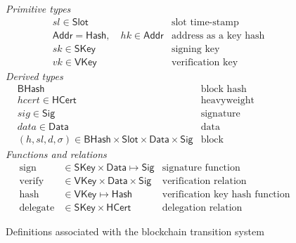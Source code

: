 \documentclass[11pt,a4paper]{article}
\newcommand{\powerset}[1]{\mathbb{P}~#1}
\newcommand{\var}[1]{\mathit{#1}}
\newcommand{\fun}[1]{\mathsf{#1}}
\newcommand{\type}[1]{\mathsf{#1}}
\newcommand{\TxId}{\type{TxId}}
\newcommand{\Ix}{\type{Ix}}
\newcommand{\Hash}{\type{Hash}}    %
\newcommand{\BHash}{\type{BHash}}  %
\newcommand{\Addr}{\type{Addr}}
\newcommand{\Slot}{\type{Slot}}
\newcommand{\HCert}{\type{HCert}}
\newcommand{\Tx}{\type{Tx}}
\newcommand{\TxIn}{\type{TxIn}}
\newcommand{\TxOut}{\type{TxOut}}
\newcommand{\SKey}{\type{SKey}}
\newcommand{\VKey}{\type{VKey}}
\newcommand{\Sig}{\type{Sig}}
\newcommand{\Data}{\type{Data}}
\newcommand{\hashname}{hash}
\newcommand{\signname}{sign}
\newcommand{\verifyname}{verify}
\newcommand{\delegatename}{delegate}
\newcommand{\inputs}[1]{\fun{inputs}\ \var{#1}}
\newcommand{\witnesses}[1]{\fun{witnesses}\ \var{#1}}
\newcommand{\addr}[1]{\fun{addr}\ \var{#1}}
\begin{document}
\begin{figure}[h]
  \emph{Primitive types}
  \begin{align*}
    & sl \in \Slot & \text{slot time-stamp}\\
    & \Addr = \Hash,\quad hk \in \Addr & \text{address as a key hash}\\
    & sk \in \SKey & \text{signing key}\\
    & vk \in \VKey & \text{verification key}
  \end{align*}
  \emph{Derived types}
  \begin{align*}
    & \BHash & \text{block hash}\\
    & hcert \in \HCert & \text{heavyweight delegation certificate}\\
    & sig \in \Sig  & \text{signature}\\
    & data \in \Data  & \text{data}\\
    & (h, sl, d, \sigma) \in \BHash \times \Slot \times \Data \times \Sig
      & \text{block}
  \end{align*}
  \emph{Functions and relations}
  \begin{align*}
    \text{\signname} & \in \SKey \times \Data \mapsto \Sig
      & \text{signature function}\\
    \text{\verifyname} & \in \VKey \times \Data \times \Sig
      & \text{verification relation}\\
    \text{\hashname} & \in \VKey \mapsto \Hash
      & \text{verification key hash function}\\
    \text{\delegatename} & \in \SKey \times \HCert
      & \text{delegation relation}
  \end{align*}
  \caption{Definitions associated with the blockchain transition system}
  \label{fig:state-trans-abstract}
\end{figure}
\end{document}
